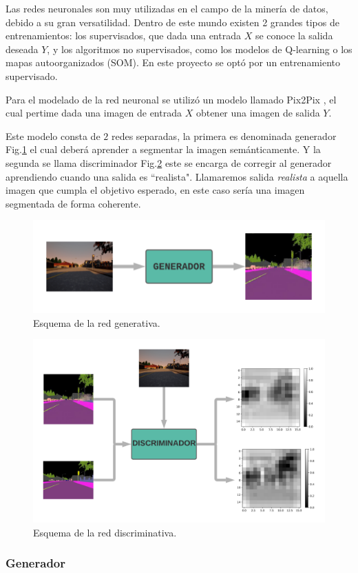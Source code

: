 \documentclass[]{IEEEtran}
\begin{document}
    Las redes neuronales son muy utilizadas en el campo de la minería de datos, debido a 
    su gran versatilidad. Dentro de este mundo existen 2 grandes tipos de entrenamientos: 
    los supervisados, que dada una entrada $X$ se conoce la salida deseada $Y$, y 
    los algoritmos no supervisados, como los modelos de Q-learning o los mapas autoorganizados (SOM).
    En este proyecto se optó por un entrenamiento supervisado.

    
    Para el modelado de la red neuronal se utilizó un modelo llamado Pix2Pix \cite{Pix2Pix},
    el cual pertime dada una imagen de entrada $X$ obtener una imagen de salida $Y$.

    Este modelo consta de $2$ redes separadas, la primera es denominada generador Fig.\ref{fig:generator}
    el cual deberá aprender a segmentar la imagen semánticamente. Y la segunda se llama discriminador Fig.\ref{fig:discr}
    este se encarga de corregir al generador aprendiendo cuando una salida es ``realista". 
    Llamaremos salida \textit{realista}  a aquella imagen que cumpla el objetivo esperado, en este caso sería una imagen segmentada 
    de forma coherente.
    
    \begin{figure}
        \centering
        \includegraphics[width=.4\textwidth]{Imgs/Generador.png}
        \caption{Esquema de la red generativa.}
        \label{fig:generator}
    \end{figure}

    \begin{figure}
        \centering
        \includegraphics[width=.4\textwidth]{Imgs/Discriminador.png}
        \caption{Esquema de la red discriminativa.}
        \label{fig:discr}
    \end{figure}
    


    \subsubsection{Generador}
    
\end{document}
